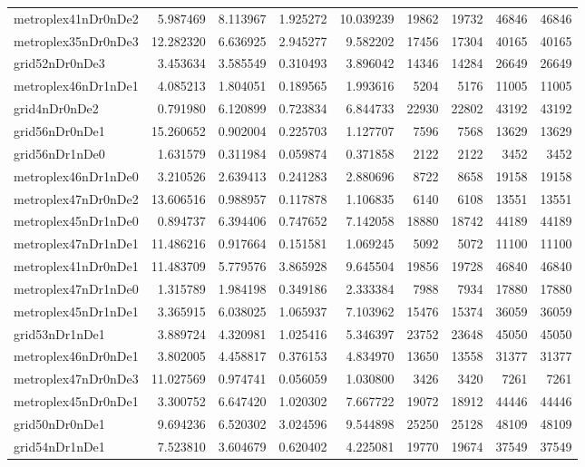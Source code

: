 \begin{longtable}{|l|r|r|r|r|r|r|r|r|}
metroplex41nDr0nDe2 & 5.987469 & 8.113967 & 1.925272 & 10.039239 & 19862 & 19732 & 46846 & 46846 \\
metroplex35nDr0nDe3 & 12.282320 & 6.636925 & 2.945277 & 9.582202 & 17456 & 17304 & 40165 & 40165 \\
grid52nDr0nDe3 & 3.453634 & 3.585549 & 0.310493 & 3.896042 & 14346 & 14284 & 26649 & 26649 \\
metroplex46nDr1nDe1 & 4.085213 & 1.804051 & 0.189565 & 1.993616 & 5204 & 5176 & 11005 & 11005 \\
grid4nDr0nDe2 & 0.791980 & 6.120899 & 0.723834 & 6.844733 & 22930 & 22802 & 43192 & 43192 \\
grid56nDr0nDe1 & 15.260652 & 0.902004 & 0.225703 & 1.127707 & 7596 & 7568 & 13629 & 13629 \\
grid56nDr1nDe0 & 1.631579 & 0.311984 & 0.059874 & 0.371858 & 2122 & 2122 & 3452 & 3452 \\
metroplex46nDr1nDe0 & 3.210526 & 2.639413 & 0.241283 & 2.880696 & 8722 & 8658 & 19158 & 19158 \\
metroplex47nDr0nDe2 & 13.606516 & 0.988957 & 0.117878 & 1.106835 & 6140 & 6108 & 13551 & 13551 \\
metroplex45nDr1nDe0 & 0.894737 & 6.394406 & 0.747652 & 7.142058 & 18880 & 18742 & 44189 & 44189 \\
metroplex47nDr1nDe1 & 11.486216 & 0.917664 & 0.151581 & 1.069245 & 5092 & 5072 & 11100 & 11100 \\
metroplex41nDr0nDe1 & 11.483709 & 5.779576 & 3.865928 & 9.645504 & 19856 & 19728 & 46840 & 46840 \\
metroplex47nDr1nDe0 & 1.315789 & 1.984198 & 0.349186 & 2.333384 & 7988 & 7934 & 17880 & 17880 \\
metroplex45nDr1nDe1 & 3.365915 & 6.038025 & 1.065937 & 7.103962 & 15476 & 15374 & 36059 & 36059 \\
grid53nDr1nDe1 & 3.889724 & 4.320981 & 1.025416 & 5.346397 & 23752 & 23648 & 45050 & 45050 \\
metroplex46nDr0nDe1 & 3.802005 & 4.458817 & 0.376153 & 4.834970 & 13650 & 13558 & 31377 & 31377 \\
metroplex47nDr0nDe3 & 11.027569 & 0.974741 & 0.056059 & 1.030800 & 3426 & 3420 & 7261 & 7261 \\
metroplex45nDr0nDe1 & 3.300752 & 6.647420 & 1.020302 & 7.667722 & 19072 & 18912 & 44446 & 44446 \\
grid50nDr0nDe1 & 9.694236 & 6.520302 & 3.024596 & 9.544898 & 25250 & 25128 & 48109 & 48109 \\
grid54nDr1nDe1 & 7.523810 & 3.604679 & 0.620402 & 4.225081 & 19770 & 19674 & 37549 & 37549 \\

\end{longtable}
